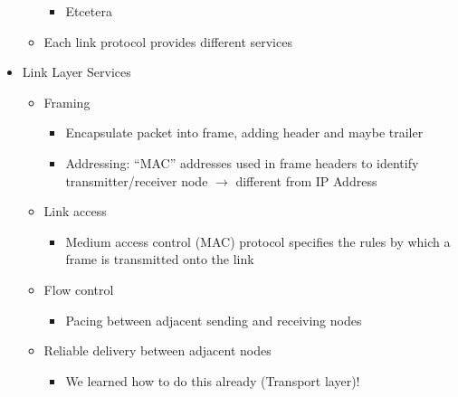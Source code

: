 \begin{itemize}
\begin{itemize}
\begin{itemize}
          \item Etcetera

        \end{itemize}

      \item Each link protocol provides different services

    \end{itemize}

  \item Link Layer Services

    \begin{itemize}

      \item Framing

        \begin{itemize}

          \item Encapsulate packet into frame, adding header and maybe trailer

          \item Addressing: ``MAC'' addresses used in frame headers to identify transmitter/receiver node $\to$ different from IP Address

        \end{itemize}

      \item Link access

        \begin{itemize}

          \item Medium access control (MAC) protocol specifies the rules by which a frame is transmitted onto the link

        \end{itemize}

      \item Flow control

        \begin{itemize}

          \item Pacing between adjacent sending and receiving nodes

        \end{itemize}

      \item Reliable delivery between adjacent nodes

        \begin{itemize}

          \item We learned how to do this already (Transport layer)!


\end{itemize}
\end{itemize}
\end{itemize}
